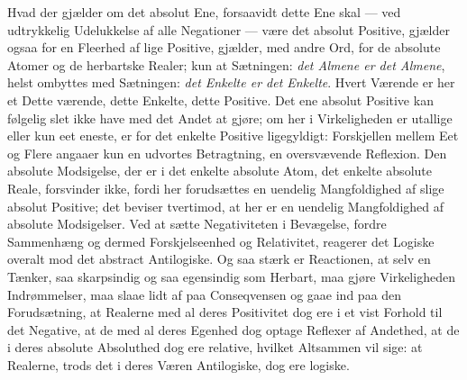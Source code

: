 \documentclass[12pt]{book}
\newcommand{\opage}[1]{\marginnote{\footnotesize\textit{[#1]}}}
\begin{document}
Hvad der gjælder om det absolut Ene, forsaavidt dette Ene skal --- ved udtrykkelig Udelukkelse
af alle Negationer --- være det absolut Positive, gjælder ogsaa for en Fleerhed af lige
Positive, gjælder, med andre Ord, for de absolute Atomer og de herbartske Realer; kun at
Sætningen: \emph{det Almene er det Almene}, helst ombyttes med Sætningen: \emph{det Enkelte er
det Enkelte}. Hvert Værende er her et Dette%
\opage{158} værende, dette Enkelte, dette Positive. Det ene absolut Positive kan følgelig slet ikke have
med det Andet at gjøre; om her i Virkeligheden er utallige eller kun eet eneste, er for det
enkelte Positive ligegyldigt: Forskjellen mellem Eet og Flere angaaer kun en udvortes
Betragtning, en oversvævende Reflexion. Den absolute Modsigelse, der er i det enkelte absolute
Atom, det enkelte absolute Reale, forsvinder ikke, fordi her forudsættes en uendelig
Mangfoldighed af slige absolut Positive; det beviser tvertimod, at her er en uendelig
Mangfoldighed af absolute Modsigelser. Ved at sætte Negativiteten i Bevægelse, fordre
Sammenhæng og dermed Forskjelseenhed og Relativitet, reagerer det Logiske overalt mod det
abstract Antilogiske. Og saa stærk er Reactionen, at selv en Tænker, saa skarpsindig og saa
egensindig som Herbart, maa gjøre Virkeligheden Indrømmelser, maa slaae lidt af paa
Conseqvensen og gaae ind paa den Forudsætning, at Realerne med al deres Positivitet dog ere i
et vist Forhold til det Negative, at de med al deres Egenhed dog optage Reflexer af Andethed, at
de i deres absolute Absoluthed dog ere relative, hvilket Altsammen vil sige: at Realerne, trods
det i deres Væren Antilogiske, dog ere logiske.
\end{document}
